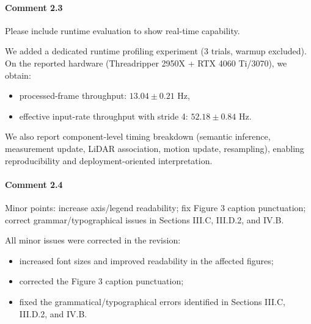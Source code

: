 \documentclass[a4paper]{article}
\def\answer#1#2{\begin{tcolorbox}[width=\textwidth,colback={white},title={\textbf{Answer
 #1}},colbacktitle=answerBoxColor,coltitle=white] #2 \end{tcolorbox} }
\begin{document}
\paragraph{Comment 2.3}
{\color{commentColor}
Please include runtime evaluation to show real-time capability.
}
\answer{2.3}{
We added a dedicated runtime profiling experiment (3 trials, warmup excluded).
On the reported hardware (Threadripper 2950X + RTX 4060 Ti/3070), we obtain:
\begin{itemize}
  \item processed-frame throughput: $13.04\pm0.21$ Hz,
  \item effective input-rate throughput with stride 4: $52.18\pm0.84$ Hz.
\end{itemize}
We also report component-level timing breakdown (semantic inference, measurement update, LiDAR association, motion update, resampling), enabling reproducibility and deployment-oriented interpretation.
}

\paragraph{Comment 2.4}
{\color{commentColor}
Minor points: increase axis/legend readability; fix Figure 3 caption punctuation; correct grammar/typographical issues in Sections III.C, III.D.2, and IV.B.
}
\answer{2.4}{
All minor issues were corrected in the revision:
\begin{itemize}
  \item increased font sizes and improved readability in the affected figures;
  \item corrected the Figure 3 caption punctuation;
  \item fixed the grammatical/typographical errors identified in Sections III.C, III.D.2, and IV.B.
\end{itemize}
}
\end{document}
